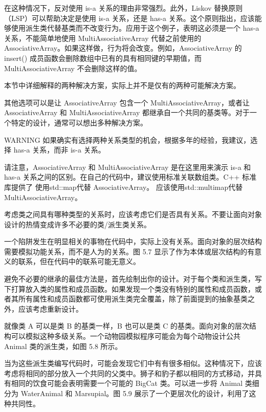 在这种情况下，反对使用 is-a 关系的理由非常强烈。此外，Liskov 替换原则（LSP）可以帮助决定是使用 is-a 关系，还是 has-a 关系。这个原则指出，应该能够使用派生类代替基类而不改变行为。应用于这个例子，表明这必须是一个 has-a 关系，不能简单地使用 MultiAssociativeArray 代替之前使用的 AssociativeArray。如果这样做，行为将会改变。例如，AssociativeArray 的 insert() 成员函数会删除数组中已有的具有相同键的早期值，而 MultiAssociativeArray 不会删除这样的值。

本节中详细解释的两种解决方案，实际上并不是仅有的两种可能解决方案。

其他选项可以是让 AssociativeArray 包含一个 MultiAssociativeArray，或者让 AssociativeArray 和 MultiAssociativeArray 都继承自一个共同的基类等。对于一个特定的设计，通常可以想出多种解决方案。

\begin{myWarning}{WARNING}
如果确实有选择两种关系类型的机会，根据多年的经验，我建议，选择 has-a 关系，而非 is-a 关系。
\end{myWarning}

请注意，AssociativeArray 和 MultiAssociativeArray 是在这里用来演示 is-a 和 has-a 关系之间的区别。在自己的代码中，建议使用标准关联数组类。C++ 标准库提供了 使用std::map代替 AssociativeArray。 应该使用std::multimap代替 MultiAssociativeArray。


考虑类之间具有哪种类型的关系时，应该考虑它们是否具有关系。不要让面向对象设计的热情变成许多不必要的类/派生类关系。

一个陷阱发生在明显相关的事物在代码中，实际上没有关系。面向对象的层次结构需要模拟功能关系，而不是人为的关系。图 5.7 显示了作为本体或层次结构的有意义的联系，但在代码中的联系可能无意义。


避免不必要的继承的最佳方法是，首先绘制出你的设计。对于每个类和派生类，写下打算放入类的属性和成员函数。如果发现一个类没有特别的属性和成员函数，或者其所有属性和成员函数都可使用派生类完全覆盖，除了前面提到的抽象基类之外，应该考虑重新设计。


就像类 A 可以是类 B 的基类一样，B 也可以是类 C 的基类。面向对象的层次结构可以模拟这种多级关系。一个动物园模拟程序可能会为每个动物设计公共 Animal 类的派生类，如图 5.8 所示。


当为这些派生类编写代码时，可能会发现它们中有有很多相似。这种情况下，应该考虑将相同的部分放入一个共同的父类中。狮子和豹子都以相同的方式移动，并具有相同的饮食可能会表明需要一个可能的 BigCat 类。可以进一步将 Animal 类细分为 WaterAnimal 和 Marsupial。图 5.9 展示了一个更层次化的设计，利用了这种共同性。

